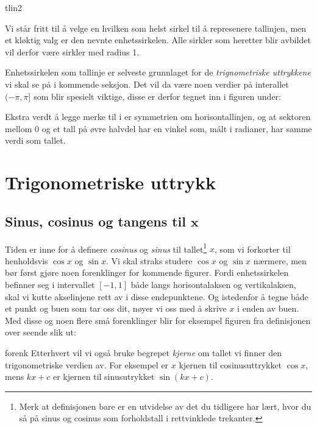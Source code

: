 {tlin2}

Vi står fritt til å velge en hvilken som helst sirkel til å represenere tallinjen, men et kløktig valg er den nevnte enhetssirkelen. Alle sirkler som heretter blir avbildet vil derfor være sirkler med radius 1. \vsk

Enhetssirkelen som tallinje er selveste grunnlaget for de \textit{trignometriske uttrykkene} vi skal se på i kommende seksjon. Det vil da være noen verdier på interallet $ (-\pi, \pi] $ som blir spesielt viktige, disse er derfor tegnet inn i figuren under:

\fig{unitcirc}{Intervallet  $ (-\pi, \pi] $ avbildet på enhetssirkelen.\label{enh}}

Ekstra verdt å legge merke til i  er symmetrien om horisontallinjen, og at sektoren mellom 0 og et tall på øvre halvdel har en vinkel som, målt i radianer, har samme verdi som tallet.
\section{Trigonometriske uttrykk}
\subsection[Sinus, cosinus og tangens til $ x $]{Sinus, cosinus og tangens til $ \bm x $}
Tiden er inne for å definere  \textit{cosinus} og \textit{sinus} til tallet\footnote{Merk at definisjonen bare er en utvidelse av det du tidligere har lært, hvor du så på sinus og cosinus som forholdstall i rettvinklede trekanter.} $ x $, som vi forkorter til henholdsvis $ \cos x $ og $ \sin x $.\newpage
\sincos \regv
Vi skal straks studere $ \cos x $ og $ \sin x $ nærmere, men bør først gjøre noen forenklinger for kommende figurer. Fordi enhetssirkelen befinner seg i intervallet $ [-1, 1] $ både langs horisontalaksen og vertikalaksen, skal vi kutte akselinjene rett av i disse endepunktene. Og istedenfor å tegne både et punkt og buen som tar oss dit, nøyer vi oss med å skrive $ x $ i enden av buen. Med disse og noen flere små forenklinger blir for eksempel figuren fra definisjonen over seende slik ut:

{forenk}
\newpage
Etterhvert vil vi også bruke begrepet \textit{kjerne} om tallet vi finner den trigonometriske verdien av. For eksempel er $ x $ kjernen til cosinusuttrykket $ \cos x $, mens $ kx+c $ er kjernen til sinusutrykket $ \sin (kx+c) $.\vsk

